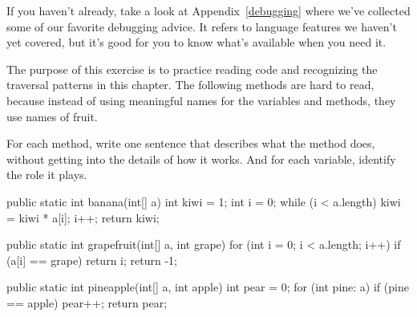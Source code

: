 If you haven't already, take a look at Appendix~\ref{debugging} where we've collected some of our favorite debugging advice.
It refers to language features we haven't yet covered, but it's good for you to know what's available when you need it.


\begin{exercise}  %

The purpose of this exercise is to practice reading code and recognizing the traversal patterns in this chapter.
The following methods are hard to read, because instead of using meaningful names for the variables and methods, they use names of fruit.

For each method, write one sentence that describes what the method does, without getting into the details of how it works.
And for each variable, identify the role it plays.

\begin{code}
public static int banana(int[] a) {
    int kiwi = 1;
    int i = 0;
    while (i < a.length) {
        kiwi = kiwi * a[i];
        i++;
    }
    return kiwi;
}
\end{code}

\begin{code}
public static int grapefruit(int[] a, int grape) {
    for (int i = 0; i < a.length; i++) {
        if (a[i] == grape) {
            return i;
        }
    }
    return -1;
}
\end{code}

\begin{code}
public static int pineapple(int[] a, int apple) {
    int pear = 0;
    for (int pine: a) {
        if (pine == apple) {
            pear++;
        }
    }
    return pear;
}
\end{code}

\end{exercise}


